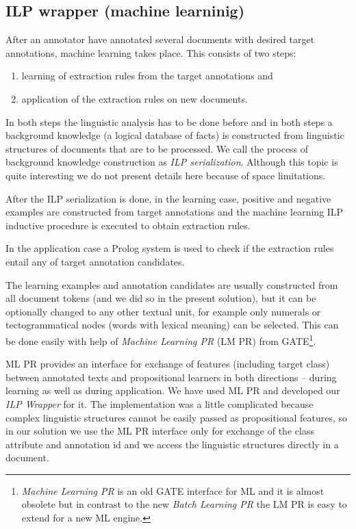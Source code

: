 \documentclass[runningheads,a4paper]{llncs}
\begin{document}
\subsection{ILP wrapper (machine learninig)}
After an annotator have annotated several documents with desired target annotations, machine learning takes place. 
This consists of two steps: 
\begin{enumerate}
	\item learning of extraction rules from the target annotations and
	\item application of the extraction rules on new documents.
\end{enumerate}
In both steps the linguistic analysis has to be done before and in both steps a background knowledge (a logical database of facts) is constructed from linguistic structures of documents that are to be processed. We call the process of background knowledge construction as \emph{ILP serialization}. Although this topic is quite interesting we do not present details here because of space limitations.

After the ILP serialization is done, in the learning case, positive and negative examples are constructed from target annotations and the machine learning ILP inductive procedure is executed to obtain extraction rules.

In the application case a Prolog system is used to check if the extraction rules entail any of target annotation candidates.

The learning examples and annotation candidates are usually constructed from all document tokens (and we did so in the present solution), but it can be optionally changed to any other textual unit, for example only numerals or tectogrammatical nodes (words with lexical meaning) can be selected. This can be done easily with help of \emph{Machine Learning PR} (LM PR) from GATE\footnote{\emph{Machine Learning PR} is an old GATE interface for ML and it is almost obsolete but in contrast to the new \emph{Batch Learning PR} the LM PR is easy to extend for a new ML engine.}.

ML PR provides an interface for exchange of features (including target class) between annotated texts and propositional learners in both directions -- during learning as well as during application. We have used ML PR and developed our \emph{ILP Wrapper} for it. The implementation was a little complicated because complex linguistic structures cannot be easily passed as propositional features, so in our solution we use the ML PR interface only for exchange of the class attribute and annotation id and we access the linguistic structures directly in a document.
\end{document}
